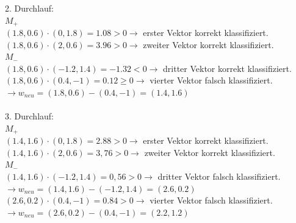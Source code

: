 \documentclass[fontsize=11pt]{scrartcl}
\begin{document}
                        2. Durchlauf:\\
                        $M_+$\\
                        $(1.8,0.6)\cdot (0,1.8) = 1.08 > 0 \rightarrow$ erster Vektor korrekt klassifiziert.\\
                        $(1.8,0.6)\cdot (2,0.6) = 3.96 > 0 \rightarrow$ zweiter Vektor korrekt klassifiziert.\\
                        $M_-$\\
                        $(1.8,0.6)\cdot (-1.2,1.4) = -1.32 < 0 \rightarrow$ dritter Vektor korrekt klassifiziert.\\
                        $(1.8,0.6)\cdot (0.4,-1) = 0.12 \geq 0 \rightarrow$ vierter Vektor falsch klassifiziert.\\
                        $\rightarrow w_{neu} = (1.8,0.6)-(0.4,-1) = (1.4,1.6)$\\
                        \\
                        3. Durchlauf:\\
                        $M_+$\\
                        $(1.4,1.6)\cdot (0,1.8) = 2.88 > 0 \rightarrow$ erster Vektor korrekt klassifiziert.\\
                        $(1.4,1.6)\cdot (2,0.6) = 3,76 > 0 \rightarrow$ zweiter Vektor korrekt klassifiziert.\\
                        $M_-$\\
                        $(1.4,1.6) \cdot (-1.2,1.4) = 0,56 > 0 \rightarrow$ dritter Vektor falsch klassifiziert.\\
                        $\rightarrow w_{neu} = (1.4,1.6)-(-1.2,1.4) = (2.6,0.2)$\\
                        $(2.6,0.2)\cdot (0.4,-1) = 0.84 > 0 \rightarrow$ vierter Vektor falsch klassifiziert.\\
                        $\rightarrow w_{neu} = (2.6,0.2)-(0.4,-1) = (2.2,1.2)$\\
\end{document}

